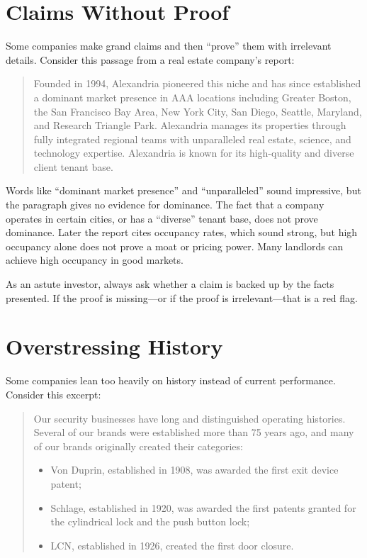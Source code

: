 \section{Claims Without Proof}

Some companies make grand claims and then ``prove'' them with irrelevant details. Consider this passage from a real estate company's report:

\begin{quote}
Founded in 1994, Alexandria pioneered this niche and has since established a dominant market presence in AAA locations including Greater Boston, the San Francisco Bay Area, New York City, San Diego, Seattle, Maryland, and Research Triangle Park. Alexandria manages its properties through fully integrated regional teams with unparalleled real estate, science, and technology expertise. Alexandria is known for its high-quality and diverse client tenant base.
\end{quote}

Words like ``dominant market presence'' and ``unparalleled'' sound impressive, but the paragraph gives no evidence for dominance. The fact that a company operates in certain cities, or has a ``diverse'' tenant base, does not prove dominance. Later the report cites occupancy rates, which sound strong, but high occupancy alone does not prove a moat or pricing power. Many landlords can achieve high occupancy in good markets.

As an astute investor, always ask whether a claim is backed up by the facts presented. If the proof is missing—or if the proof is irrelevant—that is a red flag.

\section{Overstressing History}

Some companies lean too heavily on history instead of current performance. Consider this excerpt:

\begin{quote}
Our security businesses have long and distinguished operating histories. Several of our brands were established more than 75 years ago, and many of our brands originally created their categories:
\begin{itemize}
    \item Von Duprin, established in 1908, was awarded the first exit device patent;
    \item Schlage, established in 1920, was awarded the first patents granted for the cylindrical lock and the push button lock; 
    \item LCN, established in 1926, created the first door closure.
\end{itemize}
\end{quote}

